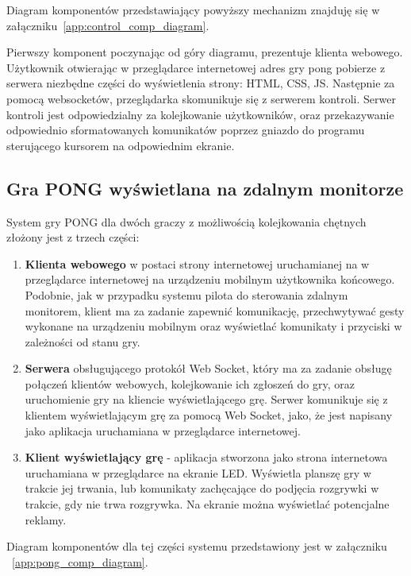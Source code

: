 Diagram komponentów przedstawiający powyższy mechanizm znajduję się w załączniku~\ref{app:control_comp_diagram}.

\par

Pierwszy komponent poczynając od góry diagramu, prezentuje klienta webowego. Użytkownik otwierając w przeglądarce internetowej adres gry pong pobierze z serwera niezbędne części do wyświetlenia strony: HTML, CSS, JS. Następnie za pomocą websocketów, przeglądarka skomunikuje się z serwerem kontroli. Serwer kontroli jest odpowiedzialny za kolejkowanie użytkowników, oraz przekazywanie odpowiednio sformatowanych komunikatów poprzez gniazdo do programu sterującego kursorem na odpowiednim ekranie.

\subsection{Gra PONG wyświetlana na zdalnym monitorze}

System gry PONG dla dwóch graczy z możliwością kolejkowania chętnych złożony jest z trzech części:

\begin{enumerate}
  \item \textbf{Klienta webowego} w postaci strony internetowej uruchamianej na w przeglądarce internetowej na urządzeniu mobilnym użytkownika końcowego. Podobnie, jak w przypadku systemu pilota do sterowania zdalnym monitorem, klient ma za zadanie zapewnić komunikację, przechwytywać gesty wykonane na urządzeniu mobilnym oraz wyświetlać komunikaty i przyciski w zależności od stanu gry.
  \item \textbf{Serwera} obsługującego protokół Web Socket, który ma za zadanie obsługę połączeń klientów webowych, kolejkowanie ich zgłoszeń do gry, oraz uruchomienie gry na kliencie wyświetlającego grę. Serwer komunikuje się z klientem wyświetlającym grę za pomocą Web Socket, jako, że jest napisany jako aplikacja uruchamiana w przeglądarce internetowej.
  \item \textbf{Klient wyświetlający grę} - aplikacja stworzona jako strona internetowa uruchamiana w przeglądarce na ekranie LED. Wyświetla planszę gry w trakcie jej trwania, lub komunikaty zachęcające do podjęcia rozgrywki w trakcie, gdy nie trwa rozgrywka. Na ekranie można wyświetlać potencjalne reklamy.
\end{enumerate}


Diagram komponentów dla tej części systemu przedstawiony jest w załączniku ~\ref{app:pong_comp_diagram}.

